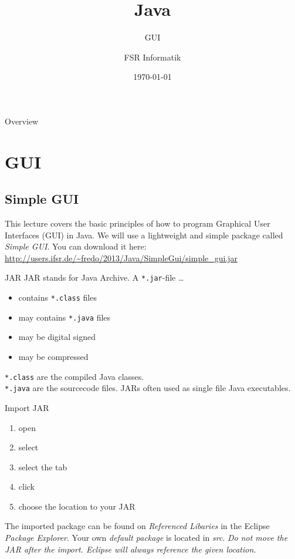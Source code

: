 

\title{Java}
\subtitle{GUI}
\author{FSR Informatik}
\date{\today}



\begin{frame}
\titlepage
\end{frame}

\begin{frame}{Overview}
\tableofcontents
\end{frame}

\section{GUI}
\subsection{Simple GUI}
\begin{frame}{}
	This lecture covers the basic principles of how to program Graphical User Interfaces (GUI) in Java.
	\vfill
	We will use a lightweight and simple package called \emph{Simple GUI}.
	You can download it here:\\
	\url{http://users.ifsr.de/~fredo/2013/Java/SimpleGui/simple_gui.jar}
\end{frame}

\begin{frame}{JAR}
	JAR stands for Java Archive. A \texttt{*.jar}-file \dots
	\begin{itemize}
		\item contains \texttt{*.class} files
		\item may contains \texttt{*.java} files
		\item may be digital signed
		\item may be compressed
	\end{itemize}
	\vfill
	\texttt{*.class} are the compiled Java classes.\\
	\texttt{*.java} are the sourcecode files.
	\vfill
	JARs often used as single file Java executables.
\end{frame}

\begin{frame}{Import JAR}
	\begin{enumerate}
		\item open 
		\item select 
		\item select the tab 
		\item click 
		\item choose the location to your JAR
	\end{enumerate}
	The imported package can be found on \emph{Referenced Libaries} in the Eclipse \emph{Package Explorer}.
	Your own \emph{default package} is located in \emph{src}.
	\vfill
	\emph{Do not move the JAR after the import. Eclipse will always reference the given location.}
\end{frame}

